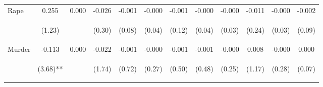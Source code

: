 \begin{tabular}{lccccccccccc}
\noalign{\smallskip}Rape & 0.255 & 0.000 & -0.026 & -0.001 & -0.000 & -0.001 & -0.000 & -0.000 & -0.011 & -0.000 & -0.002\\
 & \begin{footnotesize}(1.23)\end{footnotesize} & \begin{footnotesize}\end{footnotesize} & \begin{footnotesize}(0.30)\end{footnotesize} & \begin{footnotesize}(0.08)\end{footnotesize} & \begin{footnotesize}(0.04)\end{footnotesize} & \begin{footnotesize}(0.12)\end{footnotesize} & \begin{footnotesize}(0.04)\end{footnotesize} & \begin{footnotesize}(0.03)\end{footnotesize} & \begin{footnotesize}(0.24)\end{footnotesize} & \begin{footnotesize}(0.03)\end{footnotesize} & \begin{footnotesize}(0.09)\end{footnotesize}\\
\noalign{\smallskip}Murder & -0.113 & 0.000 & -0.022 & -0.001 & -0.000 & -0.001 & -0.001 & -0.000 & 0.008 & -0.000 & 0.000\\
 & \begin{footnotesize}(3.68)**\end{footnotesize} & \begin{footnotesize}\end{footnotesize} & \begin{footnotesize}(1.74)\end{footnotesize} & \begin{footnotesize}(0.72)\end{footnotesize} & \begin{footnotesize}(0.27)\end{footnotesize} & \begin{footnotesize}(0.50)\end{footnotesize} & \begin{footnotesize}(0.48)\end{footnotesize} & \begin{footnotesize}(0.25)\end{footnotesize} & \begin{footnotesize}(1.17)\end{footnotesize} & \begin{footnotesize}(0.28)\end{footnotesize} & \begin{footnotesize}(0.07)\end{footnotesize}\\

\end{tabular}
